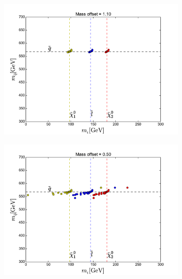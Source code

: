 \documentclass[twoside,english]{uiofysmaster}
\begin{document}
\begin{figure}[hbt]
	\begin{subfigure}[b]{0.49\textwidth}
		\includegraphics[width=\textwidth]{figures/25_events_simplistic_scipy_nelder-mead_without_smearing_1p10_initial_guess.pdf} 
		\caption{}
	\end{subfigure}
	\begin{subfigure}[b]{0.49\textwidth}
		\includegraphics[width=\textwidth]{figures/25_events_simplistic_scipy_nelder-mead_without_smearing_0p50_initial_guess.pdf} 
		\caption{}
	\end{subfigure}


\end{figure}
\end{document}
